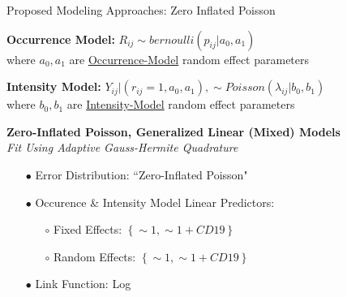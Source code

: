 \documentclass[11pt]{beamer}
\begin{document}
\begin{frame}{Proposed Modeling Approaches: Zero Inflated Poisson}

\textbf{Occurrence Model:} $R_{ij} \sim bernoulli \left( p_{ij} | a_{0}, a_{1}  \right)$\\

where $a_{0}, a_{1}$ are \underline{Occurrence-Model} random effect parameters\\

\vspace{10pt}

\textbf{Intensity Model:} $Y_{ij} | \left( r_{ij}=1, a_{0}, a_{1}  \right),  \sim Poisson \left( \lambda_{ij} | b_{0}, b_{1}  \right) $\\
 where $b_{0}, b_{1}$ are \underline{Intensity-Model} random effect parameters\\

\vspace{10pt}

\textbf{Zero-Inflated Poisson, Generalized Linear (Mixed) Models}\\
\vspace{5pt}
\textit{Fit Using Adaptive Gauss-Hermite Quadrature}\\

\vspace{5pt}

	\begin{itemize}
		\setlength{\itemsep}{1\baselineskip}
		\item[$\bullet$] Error Distribution: ``Zero-Inflated Poisson"
		\item[$\bullet$] Occurence \& Intensity Model Linear Predictors: 
		\begin{itemize}
			\item[$\circ$] Fixed Effects: $\left \{   \sim 1, \sim 1+CD19  \right \}$
			\item[$\circ$] Random Effects: $\left \{   \sim 1, \sim 1+CD19  \right \}$
		\end{itemize}
		\item[$\bullet$] Link Function: Log
	\end{itemize}
\end{frame}
\end{document}
